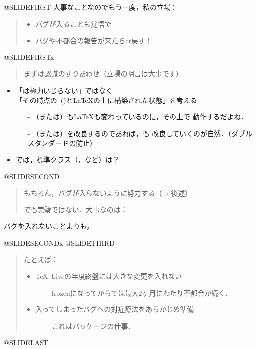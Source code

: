 \documentclass[a4paper,papersize,25pt,slide,dvipdfmx]{jsarticle}
\begin{document}
@SLIDEFIRST
大事なことなのでもう一度，私の立場：
\begin{quote}
\begin{itemize}
\item バグが入ることも覚悟で
\item バグや不都合の報告が来たらor戻す！
\end{itemize}
\end{quote}
@SLIDEFIRSTx
\begin{quote}
まずは認識のすりあわせ（立場の明言は大事です）
\end{quote}
\begin{itemize}
\item 「\pLaTeX は極力いじらない」ではなく \\
      「その時点の\pTeX\ (\epTeX)と\LaTeX の上に構築された状態」を考える
\begin{itemize}
\item[-] \pTeX （または\epTeX）も\LaTeX も変わっているのに，その上で
動作するだよね．
\item[-] \pTeX （または\epTeX）を改良するのであれば，\pLaTeX も
改良していくのが自然．（ダブルスタンダードの防止）
\end{itemize}
\item では，\pLaTeX 標準クラス（，など）は？
\end{itemize}
@SLIDESECOND
\begin{quote}
もちろん，バグが入らないように努力する（→ 後述）\par
でも完璧ではない．大事なのは：
\end{quote}
\begin{center}
バグを入れないことよりも，
\end{center}
@SLIDESECONDx
@SLIDETHIRD
\begin{quote}
たとえば：
\begin{itemize}
  \item \TeX\ Liveの年度終盤には大きな変更を入れない
  \begin{itemize}
    \item[-] frozenになってからでは最大2ヶ月にわたり不都合が続く．
  \end{itemize}
  \item 入ってしまったバグへの対症療法をあらかじめ準備
  \begin{itemize}
    \item[-] これはパッケージの仕事．
  \end{itemize}
\end{itemize}
\end{quote}
@SLIDELAST
\SLIDEEND
\end{document}
